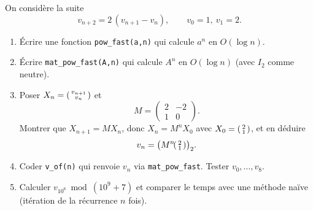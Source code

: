 \begin{exercise}
On considère la suite
\[
v_{n+2}=2\,(v_{n+1}-v_n),\qquad v_0=1,\ v_1=2.
\]

\begin{enumerate}
  \item Écrire une fonction \texttt{pow\_fast(a,n)} qui calcule $a^n$ en $O(\log n)$.
  \item Écrire \texttt{mat\_pow\_fast(A,n)} qui calcule $A^n$ en $O(\log n)$ (avec $I_2$ comme neutre).
  \item Poser $X_n=\begin{psmallmatrix}v_{n+1}\\ v_n\end{psmallmatrix}$ et
  \[
  M=\begin{pmatrix}2&-2\\[2pt]1&0\end{pmatrix}.
  \]
  Montrer que $X_{n+1}=MX_n$, donc $X_n=M^nX_0$ avec $X_0=\begin{psmallmatrix}2\\1\end{psmallmatrix}$, et en déduire
  \[
  v_n=\big(M^n\!\begin{psmallmatrix}2\\1\end{psmallmatrix}\big)_2.
  \]
  \item Coder \texttt{v\_of(n)} qui renvoie $v_n$ via \texttt{mat\_pow\_fast}. Tester $v_0,\dots,v_8$.
  \item Calculer $v_{10^6}\bmod(10^9+7)$ et comparer le temps avec une méthode naïve (itération de la récurrence $n$ fois).
\end{enumerate}
\end{exercise}